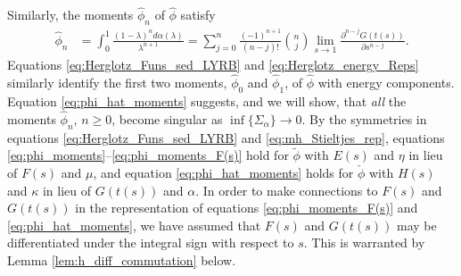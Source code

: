 \documentclass[jmp,graphicx]{revtex4-1}
\newcommand{\ph}{\hat{\phi}}
\begin{document}
Similarly, the moments $\ph_n$ of $\ph$ satisfy
%
\begin{align}\label{eq:phi_hat_moments}
  \ph_n%
      &=\int_0^1\frac{(1-\lambda)^nd\alpha(\lambda)}{\lambda^{n+1}}
      =\sum_{j=0}^n\frac{(-1)^{n+1}}{(n-j)!}{n \choose j}
             \lim_{s\to1}\frac{\partial^{n-j}G(t(s))}{\partial s^{n-j}}.
\end{align}
%
Equations \eqref{eq:Herglotz_Funs_sed_LYRB} and
\eqref{eq:Herglotz_energy_Reps} similarly identify the first
two moments, $\ph_0$ and $\ph_1$, of $\ph$ with energy components. Equation
\eqref{eq:phi_hat_moments} suggests, and we will show, that \emph{all}
the moments $\ph_n$, $n\geq0$, become singular as $\inf\{\Sigma_\alpha\}\to0$. By the
symmetries in equations \eqref{eq:Herglotz_Funs_sed_LYRB} and
\eqref{eq:mh_Stieltjes_rep}, equations 
\eqref{eq:phi_moments}--\eqref{eq:phi_moments_F(s)} hold for
$\tilde{\phi}$ with $E(s)$ and $\eta$ in lieu of $F(s)$ and $\mu$, and equation
\eqref{eq:phi_hat_moments} holds for $\check{\phi}$ with $H(s)$ and $\kappa$ in lieu
of $G(t(s))$ and $\alpha$. In order to make connections to $F(s)$ and $G(t(s))$ in the
representation of equations \eqref{eq:phi_moments_F(s)} and
\eqref{eq:phi_hat_moments}, we have assumed that $F(s)$ and $G(t(s))$ may
be differentiated under the integral sign with respect to $s$. This
is warranted by Lemma \ref{lem:h_diff_commutation} below.
\end{document}
